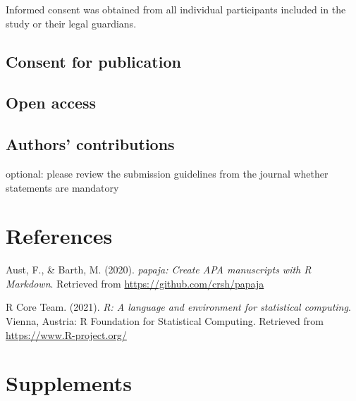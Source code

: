 \documentclass[
  english,
  man,floatsintext]{apa6}
\newlength{\cslhangindent}
\newlength{\cslentryspacingunit} %
\newenvironment{CSLReferences}[2] %
 {%
  \setlength{\parindent}{0pt}
  \ifodd #1
  \let\oldpar\par
  \def\par{\hangindent=\cslhangindent\oldpar}
  \fi
  \setlength{\parskip}{#2\cslentryspacingunit}
 }%
 {}
\begin{document}
Informed consent was obtained from all individual participants included in the study or their legal guardians.

\hypertarget{consent-for-publication}{%
\subsection{Consent for publication}\label{consent-for-publication}}

\hypertarget{open-access}{%
\subsection{Open access}\label{open-access}}

\hypertarget{authors-contributions}{%
\subsection{Authors' contributions}\label{authors-contributions}}

optional: please review the submission guidelines from the
journal whether statements are mandatory

\newpage

\hypertarget{references}{%
\section{References}\label{references}}

\begingroup
\setlength{\parindent}{-0.5in}
\setlength{\leftskip}{0.5in}

\hypertarget{refs}{}
\begin{CSLReferences}{1}{0}
\leavevmode{}%
Aust, F., \& Barth, M. (2020). \emph{{papaja}: {Create} {APA} manuscripts with {R Markdown}}. Retrieved from \url{https://github.com/crsh/papaja}

\leavevmode{}%
R Core Team. (2021). \emph{R: A language and environment for statistical computing}. Vienna, Austria: R Foundation for Statistical Computing. Retrieved from \url{https://www.R-project.org/}

\end{CSLReferences}

\endgroup

\newpage

\hypertarget{supplements}{%
\section{Supplements}\label{supplements}}
\end{document}
